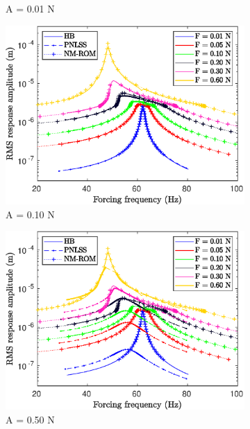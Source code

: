 \documentclass[aspectratio=169]{beamer}
\begin{document}
\begin{frame}[allowframebreaks]
\begin{figure}[!h]
\begin{subfigure}[!h]{0.2\linewidth}
      \caption{A = 0.01 N}
    \end{subfigure}%
    \begin{subfigure}[!h]{0.2\linewidth}
      \includegraphics[width=\linewidth]{../../benchmark4/extabs_fig/b4_fresp_comp_famp01_nx23}
      \caption{A = 0.10 N}
    \end{subfigure}%
    \begin{subfigure}[!h]{0.2\linewidth}
      \includegraphics[width=\linewidth]{../../benchmark4/extabs_fig/b4_fresp_comp_famp05_nx23}
      \caption{A = 0.50 N}
    \end{subfigure}%
    \begin{subfigure}[!h]{0.2\linewidth}

\end{subfigure}
\end{figure}
\end{frame}
\end{document}

